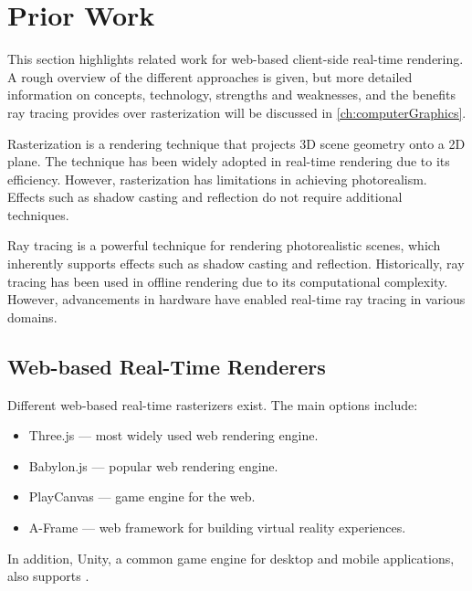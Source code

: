 \section{Prior Work}

This section highlights related work for web-based client-side real-time rendering. A rough overview of the different approaches is given, but more detailed information on concepts, technology, strengths and weaknesses, and the benefits ray tracing provides over rasterization will be discussed in \autoref{ch:computerGraphics}.

Rasterization is a rendering technique that projects 3D scene geometry onto a 2D plane. The technique has been widely adopted in real-time rendering due to its efficiency. However, rasterization has limitations in achieving photorealism. Effects such as shadow casting and reflection do not require additional techniques.

Ray tracing is a powerful technique for rendering photorealistic scenes, which inherently supports effects such as shadow casting and reflection. Historically, ray tracing has been used in offline rendering due to its computational complexity. However, advancements in hardware have enabled real-time ray tracing in various domains.

\subsection*{Web-based Real-Time Renderers}

Different web-based real-time rasterizers exist. The main options include:

\begin{itemize}
  \item {\gls{Three.js}} \cite{threeJSWebsite} — most widely used web rendering engine.
  \item {\gls{Babylon.js}} \cite{babylonJSWebsite} — popular web rendering engine.
  \item {\gls{PlayCanvas}} \cite{playCanvasWebsite} — game engine for the web.
  \item {\gls{A-Frame}} \cite{aFrameWebsite} — web framework for building virtual reality experiences.
\end{itemize}

In addition, \gls{Unity}, a common game engine for desktop and mobile applications, also supports  \cite{unityWebGLCompatibility}.

